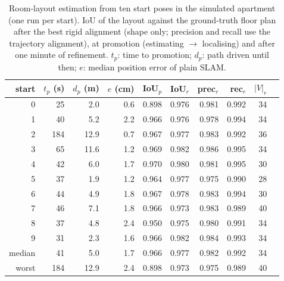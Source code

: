 \begin{table}[t]
\centering
\caption{Room-layout estimation from ten start poses in the simulated apartment (one run per start). IoU of the layout against the ground-truth floor plan after the best rigid alignment (shape only; precision and recall use the trajectory alignment), at promotion (estimating $\to$ localising) and after one minute of refinement. $t_p$: time to promotion; $d_p$: path driven until then; $e$: median position error of plain SLAM.}
\label{tab:estimation-campaign}
\begin{tabular}{r r r r r r r r r r}
\toprule
start & $t_p$ (s) & $d_p$ (m) & $e$ (cm) & IoU$_p$ & IoU$_r$ & prec$_r$ & rec$_r$ & $|V|_r$ \\
\midrule
0 & 25 & 2.0 & 0.6 & 0.898 & 0.976 & 0.981 & 0.992 & 34 \\
1 & 40 & 5.2 & 2.2 & 0.966 & 0.976 & 0.978 & 0.994 & 34 \\
2 & 184 & 12.9 & 0.7 & 0.967 & 0.977 & 0.983 & 0.992 & 36 \\
3 & 65 & 11.6 & 1.2 & 0.969 & 0.982 & 0.986 & 0.995 & 34 \\
4 & 42 & 6.0 & 1.7 & 0.970 & 0.980 & 0.981 & 0.995 & 30 \\
5 & 37 & 1.9 & 1.2 & 0.964 & 0.977 & 0.975 & 0.990 & 28 \\
6 & 44 & 4.9 & 1.8 & 0.967 & 0.978 & 0.983 & 0.994 & 30 \\
7 & 46 & 7.1 & 1.8 & 0.966 & 0.973 & 0.983 & 0.989 & 40 \\
8 & 37 & 4.8 & 2.4 & 0.950 & 0.975 & 0.980 & 0.991 & 34 \\
9 & 31 & 2.3 & 1.6 & 0.966 & 0.982 & 0.984 & 0.993 & 34 \\
\midrule
median & 41 & 5.0 & 1.7 & 0.966 & 0.977 & 0.982 & 0.992 & 34 \\
worst & 184 & 12.9 & 2.4 & 0.898 & 0.973 & 0.975 & 0.989 & 40 \\
\bottomrule
\end{tabular}
\end{table}
